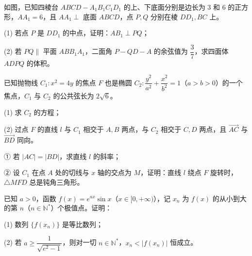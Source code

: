 \begin{question}

如图，已知四棱台 \(ABCD-A_1B_1C_1D_1\) 的上、下底面分别是边长为 3 和 6 的正方形，\(AA_1=6\)，且 \(AA_1\perp\) 底面 \(ABCD\)，点 \(P,Q\) 分别在棱 \(DD_1,BC\) 上。
\nopagebreak[4]
\begin{center}\end{center}
\nopagebreak[4]
(1) 若点 \(P\) 是 \(DD_1\) 的中点，证明：\(AB_1\perp PQ\)；

(2) 若 \(PQ\parallel\) 平面 \(ABB_1A_1\)，二面角 \(P-QD-A\) 的余弦值为 \(\dfrac37\)，求四面体 \(ADPQ\) 的体积。

\end{question}
\begin{question}

已知抛物线 \(C_1:x^2=4y\) 的焦点 \(F\) 也是椭圆 \(C_2:\dfrac{y^2}{a^2}+\dfrac{x^2}{b^2}=1\)（\(a>b>0\)）的一个焦点，\(C_1\) 与 \(C_2\) 的公共弦长为 \(2\sqrt6\)。

(1) 求 \(C_2\) 的方程；

(2) 过点 \(F\) 的直线 \(l\) 与 \(C_1\) 相交于 \(A,B\) 两点，与 \(C_2\) 相交于 \(C,D\) 两点，且 \(\overrightarrow{AC}\) 与 \(\overrightarrow{BD}\) 同向。

① 若 \(\lvert AC\rvert=\lvert BD\rvert\)，求直线 \(l\) 的斜率；

② 设 \(C_1\) 在点 \(A\) 处的切线与 \(x\) 轴的交点为 \(M\)，证明：直线 \(l\) 绕点 \(F\) 旋转时，\(\triangle MFD\) 总是钝角三角形。

\end{question}
\begin{question}

已知 \(a>0\)，函数 \(f(x)=e^{ax}\sin x\)（\(x\in[0,+\infty)\)），记 \(x_n\) 为 \(f(x)\) 的从小到大的第 \(n\)（\(n\in\mathbb N^*\)）个极值点。证明：

(1) 数列 \(\{f(x_n)\}\) 是等比数列；

(2) 若 \(a\geqslant\dfrac{1}{\sqrt{e^2-1}}\)，则对一切 \(n\in\mathbb N^*\)，\(x_n<\lvert f(x_n)\rvert\) 恒成立。

\end{question}
